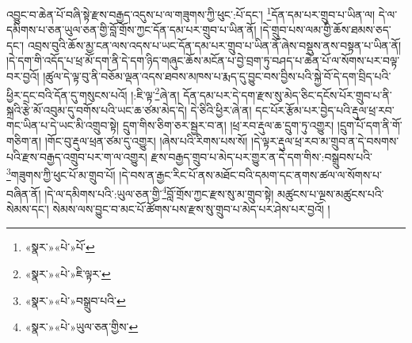 འབྱུང་བ་ཆེན་པོ་བཞི་སྟེ་རྫས་བརྒྱད་འདུས་པ་ལ་གཟུགས་ཀྱི་ཕུང་:པོ་དང་། \footnote{«སྣར་»«པེ་»པོ་}དོན་དམ་པར་གྲུབ་པ་ཡིན་ལ། དེ་ལ་དམིགས་པ་ཅན་ཡུལ་ཅན་གྱི་བློ་གྲོས་ཀྱང་དོན་དམ་པར་གྲུབ་པ་ཡིན་ནོ། །དེ་གྲུབ་པས་ལམ་གྱི་ཆོས་ཐམས་ཅད་དང་། འབྲས་བུའི་ཆོས་མྱ་ངན་ལས་འདས་པ་ཡང་དོན་དམ་པར་གྲུབ་པ་ཡིན་ནོ་ཞེས་བསྡུས་ནས་བསྟན་པ་ཡིན་ནོ། །དེ་དག་གི་འདོད་པ་ཕྲ་མོ་དག་ནི་དེ་དག་ཉིད་གཞུང་ཆོས་མངོན་པ་བྱེ་བྲག་ཏུ་བཤད་པ་ཆེན་པོ་ལ་སོགས་པར་བལྟ་བར་བྱའོ། །ཚུལ་དེ་ལྟ་བུ་ནི་བཅོམ་ལྡན་འདས་ཐབས་མཁས་པ་རྨད་དུ་བྱུང་བས་བྱིས་པའི་སྐྱེ་བོ་དེ་དག་བྲིད་པའི་ཕྱིར་དྲང་བའི་དོན་དུ་གསུངས་པའོ། །:ཇི་ལྟ་\footnote{«སྣར་»«པེ་»ཇི་ལྟར་}ཞེ་ན། དོན་དམ་པར་དེ་དག་རྫས་སུ་མེད་ཅིང་དངོས་པོར་གྲུབ་པ་ནི་སྐྲའི་རྩེ་མོ་འབུམ་དུ་བགོས་པའི་ཡང་ཆ་ཙམ་མེད་དེ། དེ་ཅིའི་ཕྱིར་ཞེ་ན། དང་པོར་རྩོམ་པར་བྱེད་པའི་རྡུལ་ཕྲ་རབ་གང་ཡིན་པ་དེ་ཡང་མི་འགྲུབ་སྟེ། དྲུག་གིས་ཅིག་ཅར་སྦྱར་བ་ན། །ཕྲ་རབ་རྡུལ་ཆ་དྲུག་ཏུ་འགྱུར། །དྲུག་པོ་དག་ནི་གོ་གཅིག་ན། །གོང་བུ་རྡུལ་ཕྲན་ཙམ་དུ་འགྱུར། །ཞེས་པའི་རིགས་པས་སོ། །དེ་ལྟར་རྡུལ་ཕྲ་རབ་མ་གྲུབ་ན་དེ་བསགས་པའི་རྫས་བརྒྱད་འགྲུབ་པར་ག་ལ་འགྱུར། རྫས་བརྒྱད་གྲུབ་པ་མེད་པར་གྱུར་ན་དེ་དག་གིས་:བསྒྲུབས་པའི་\footnote{«སྣར་»«པེ་»བསྒྲུབ་པའི་}གཟུགས་ཀྱི་ཕུང་པོ་མ་གྲུབ་པོ། །དེ་བས་ན་རྒྱང་རིང་པོ་ནས་མཐོང་བའི་དམག་དང་ནགས་ཚལ་ལ་སོགས་པ་བཞིན་ནོ། །དེ་ལ་དམིགས་པའི་:ཡུལ་ཅན་གྱི་\footnote{«སྣར་»«པེ་»ཡུལ་ཅན་གྱིས་}བློ་གྲོས་ཀྱང་རྫས་སུ་མ་གྲུབ་སྟེ། མཚུངས་པ་ལྔས་མཚུངས་པའི་སེམས་དང་། སེམས་ལས་བྱུང་བ་མང་པོ་ཚོགས་པས་རྫས་སུ་གྲུབ་པ་མེད་པར་ཤེས་པར་བྱའོ། །
